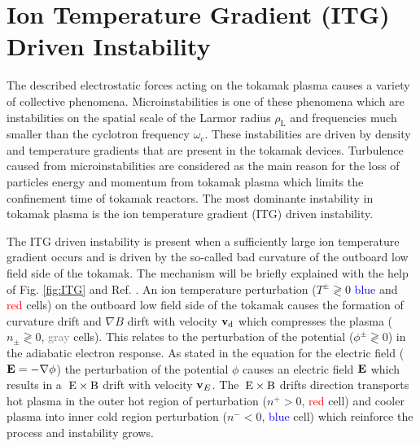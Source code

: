 \newpage
\section{Ion Temperature Gradient (ITG) Driven Instability}
\label{sec:ITG}

The described electrostatic forces acting on the tokamak plasma causes a variety of collective phenomena. Microinstabilities is one of these phenomena which are instabilities on the spatial scale of the Larmor radius $\rho_\mathrm{L}$ and frequencies much smaller than the cyclotron frequency $\omega_\mathrm{c}$. These instabilities are driven by density and temperature gradients that are present in the tokamak devices. Turbulence caused from microinstabilities are considered as the main reason for the loss of particles energy and momentum from tokamak plasma \cite{Brizard2007, Garbet2010, Horton1999} which limits the confinement time of tokamak reactors. The most dominante instability in tokamak plasma is the ion temperature gradient (ITG) driven instability. \cite{Coppi1967, Cowley1991, Rudakov1961}


The ITG driven instability is present when a sufficiently large ion temperature gradient occurs and is driven by the so-called bad curvature of the outboard low field side of the tokamak. The mechanism will be briefly explained with the help of Fig. \ref{fig:ITG} and Ref. . An ion temperature perturbation ($T^\pm \gtrless 0$ \textcolor{blue}{blue} and \textcolor{red}{red} cells) on the outboard low field side of the tokamak causes the formation of curvature drift and $\nabla B$ dirft with velocity $\boldsymbol{\mathbf{v}}_\mathrm{d}$ which compresses the plasma ($n_\pm \gtrless 0$, \textcolor{gray}{gray} cells). This relates to the perturbation of the potential ($\phi^\pm  \gtrless 0$) in the adiabatic electron response. As stated in the equation for the electric field ($\boldsymbol{\mathbf{E}} = -\nabla \phi$) the perturbation of the potential $\phi$ causes an electric field $\boldsymbol{\mathbf{E}}$ which results in a $\mathrm{\:E}\times\mathrm{B}$ drift with velocity $\boldsymbol{\mathbf{v}}_E$. The $\mathrm{\:E}\times\mathrm{B}$ drifts direction transports hot plasma in the outer hot region of perturbation ($n^+ > 0$, \textcolor{red}{red} cell) and cooler plasma into inner cold region perturbation ($n^- < 0$, \textcolor{blue}{blue} cell) which reinforce the process and instability grows.\bigskip

